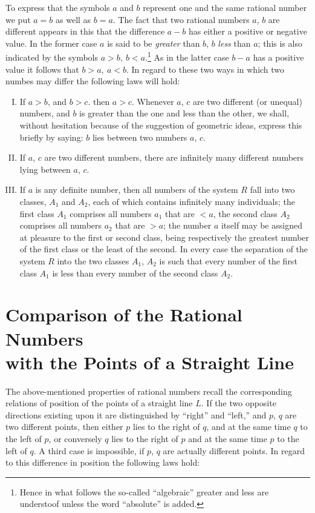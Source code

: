 \documentclass[oneside,12pt]{book}
\begin{document}
To express that the symbols $a$ and $b$ represent one and the same rational number we put $a=b$ as well as $b=a$. The fact that two rational numbers $a$, $b$ are different appears 
in this that the difference $a-b$ has either a positive or negative value. In the former case $a$ is said to be \textit{greater} than $b$, $b$ \textit{less} than $a$; this is also
indicated by the symbols $a>b,\ b<a$.\footnote{Hence in what follows the so-called ``algebraic'' greater and less are understoof unless the word ``absolute'' is added.} As in the latter case $b-a$ has a positive value it follows that $b>a,\ a<b$. In regard to these two ways in which two numbes may differ the 
following laws will hold: \par 

\begin{enumerate}[I.]
    \item If $a>b$, and $b>c$. then $a>c$. Whenever $a$, $c$ are two different (or unequal) numbers, and $b$ is greater than the one and less than the other, 
    we shall, without hesitation because of the suggestion of geometric ideas, express this briefly by saying: $b$ lies between two numbers $a$, $c$.
    \item If $a$, $c$ are two different numbers, there are infinitely many different numbers lying between $a$, $c$.
    \item If $a$ is any definite number, then all numbers of the system $R$ fall into two classes, $A_1$ and $A_2$, each of which contains infinitely many individuals; the first class $A_1$ comprises all numbers $a_1$ that are $<a$, the second class $A_2$ comprises all numbers $a_2$ that are $>a$; the number $a$ itself may be assigned at pleasure to the first or second class, being respectively the greatest number of the first class or the least of the second. In every case the separation of the system $R$ into the two classes $A_1$, $A_2$ is such that every number of the first class $A_1$ is less than every number of the second class $A_2$.
\end{enumerate}

\section{Comparison of the Rational Numbers\\with the Points of a Straight Line}
\label{S2}
The above-mentioned properties of rational numbers recall the corresponding relations of position of the points of a straight line $L$. If the two opposite directions existing upon it are distinguished by ``right'' and ``left,'' and $p$, $q$ are two different points, then either $p$ lies to the right of $q$, and at the same time $q$ to the left of $p$, or conversely $q$ lies to the right of $p$ and at the same time $p$ to the left of $q$. A third case is impossible, if $p$, $q$ are actually different points. In regard to this difference in position the following laws hold: \par 
\end{document}
